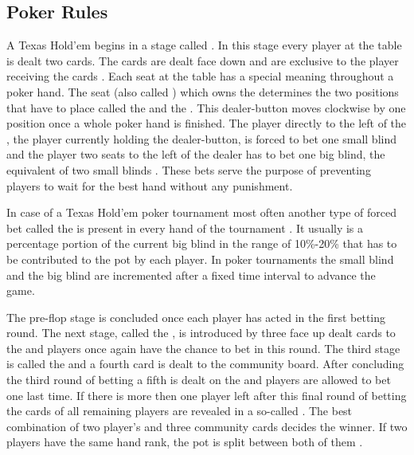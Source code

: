\subsection{Poker Rules}
A Texas Hold'em  begins in a stage called . In this stage every player at the table is dealt two cards. The cards are dealt face down and are exclusive to the player receiving the cards \cite{billings_phd}. Each seat at the table has a special meaning throughout a poker hand. The seat (also called ) which owns the  determines the two positions that have to place   called the  and the . This dealer-button moves clockwise by one position once a whole poker hand is finished. The player directly to the left of the , the player currently holding the dealer-button, is forced to bet one small blind and the player two seats to the left of the dealer has to bet one big blind, the equivalent of two small blinds \cite{master_nuno}. These bets serve the purpose of preventing players to wait for the best hand without any punishment. \par In case of a Texas Hold'em poker tournament most often another type of forced bet called the  is present in every hand of the tournament \cite{poker_dummies}. It usually is a percentage portion of the current big blind in the range of 10\%-20\% that has to be contributed to the pot by each player.
In poker tournaments the small blind and the big blind are incremented after a fixed time interval to advance the game.  \par
The pre-flop stage is concluded once each player has acted in the first betting round. The next stage, called the , is introduced by three face up dealt cards to the  and players once again have the chance to bet in this round. The third stage is called the  and a fourth card is dealt to the community board. After concluding the third round of betting a fifth  is dealt on the  and players are allowed to bet one last time. If there is more then one player left after this final round of betting the cards of all remaining players are revealed in a so-called . The best combination of two player's  and three community cards decides the winner. If two players have the same hand rank, the pot is split between both of them \cite{billings_phd}.
